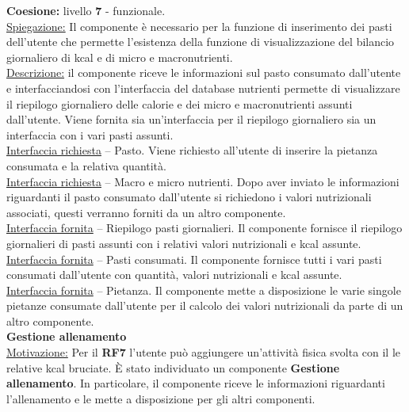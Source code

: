 \documentclass{article}
\begin{document}
      \textbf{Coesione:} livello \textbf{7} - funzionale.\\

      \underline{Spiegazione:} Il componente è necessario per la funzione di inserimento dei pasti dell’utente che permette l’esistenza della funzione di visualizzazione del bilancio
      giornaliero di kcal e di micro e macronutrienti.\\

      \underline{Descrizione:} il componente riceve le informazioni sul pasto consumato dall’utente e interfacciandosi con l’interfaccia del database nutrienti permette di
      visualizzare il riepilogo giornaliero delle calorie e dei micro e macronutrienti assunti dall’utente. Viene fornita sia un’interfaccia per il riepilogo giornaliero sia un
      interfaccia con i vari pasti assunti.\\

      \underline{Interfaccia richiesta} – Pasto. Viene richiesto all’utente di inserire la pietanza consumata e la relativa quantità.\\

      \underline{Interfaccia richiesta} – Macro e micro nutrienti. Dopo aver inviato le informazioni riguardanti il pasto consumato dall’utente si richiedono i valori nutrizionali
      associati, questi verranno forniti da un altro componente.\\

      \underline{Interfaccia fornita} – Riepilogo pasti giornalieri. Il componente fornisce il riepilogo giornalieri di pasti assunti con i relativi valori nutrizionali e kcal
      assunte.\\

      \underline{Interfaccia fornita} – Pasti consumati. Il componente fornisce tutti i vari pasti consumati dall’utente con quantità, valori nutrizionali e kcal assunte.\\
 
      \underline{Interfaccia fornita} – Pietanza. Il componente mette a disposizione le varie singole pietanze consumate dall’utente per il calcolo dei valori nutrizionali da parte
      di un altro componente.\\


      {\Large\textbf{Gestione allenamento}}\\

      \underline{Motivazione:} Per il \textbf{RF7} l’utente può aggiungere un’attività fisica svolta con il le relative kcal bruciate. È stato individuato un componente
      \textbf{Gestione allenamento}.
      In particolare, il componente riceve le informazioni riguardanti l’allenamento e le mette a disposizione per gli altri componenti.\\
\end{document}
